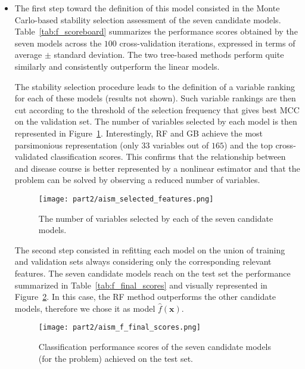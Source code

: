 \begin{itemize}
	\item[] \textbf{\F}
	The first step toward the definition of this model consisted in the Monte Carlo-based stability selection assessment of the seven candidate models. Table~\ref{tab:f_scoreboard} summarizes the performance scores obtained by the seven models across the $100$ cross-validation iterations, expressed in terms of average $\pm$ standard deviation. The two tree-based methods perform quite similarly and consistently outperform the linear models.
	
	
	
	The stability selection procedure leads to the definition of a variable ranking for each of these models (results not shown). Such variable rankings are then cut according to the threshold of the selection frequency that gives best MCC on the validation set. The number of variables selected by each model is then represented in Figure~\ref{fig:n_selected}. Interestingly, RF and GB achieve the most parsimonious representation (only $33$ variables out of $165$) and the top cross-validated classification scores. This confirms that the relationship between \PCOs and disease course is better represented by a nonlinear estimator and that the \F problem can be solved by observing a reduced number of \PCO variables.
	
	\begin{figure}[]
		\centering
		\texttt{[image: part2/aism\_selected\_features.png]}
		\caption{The number of variables selected by each of the seven candidate models.} \label{fig:n_selected}
	\end{figure}

	The second step consisted in refitting each model on the union of training and validation sets always considering only the corresponding relevant features.
	The seven candidate models reach on the test set the performance summarized in Table~\ref{tab:f_final_scores} and visually represented in Figure~\ref{fig:f_final_scores}.
	In this case, the RF method outperforms the other candidate models, therefore we chose it as \F model $\hat{f}(\bm{x})$.

	
	
	\begin{figure}[]
		\centering
		\texttt{[image: part2/aism\_f\_final\_scores.png]}
		\caption{Classification performance scores of the seven candidate models (for the \F problem) achieved on the test set.} \label{fig:f_final_scores}
	\end{figure}


\end{itemize}
